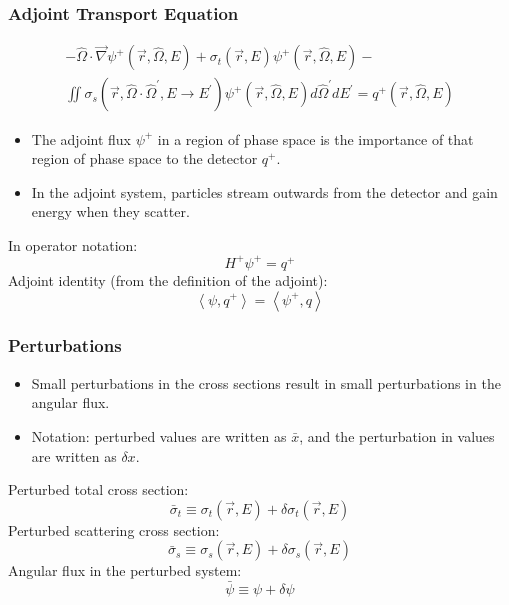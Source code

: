 \documentclass[t]{beamer}
\begin{document}
\begin{frame}
  \frametitle{Adjoint Transport Equation}
  \begin{multline}
    -\hat{\Omega}\cdot\vec{\nabla}\psi^+\left(\vec{r},\hat{\Omega},E\right) +
    \sigma_t\left(\vec{r},E\right)\psi^+\left(\vec{r},\hat{\Omega},E\right) - \\
    \iint\sigma_s\left(\vec{r},\hat{\Omega}\cdot\hat{\Omega}^\prime,E\rightarrow E^\prime\right)\psi^+\left(\vec{r},\hat{\Omega},E\right)d\hat{\Omega}^\prime dE^\prime =
    q^+\left(\vec{r},\hat{\Omega},E\right)
  \end{multline}
  \begin{itemize}
    \item The adjoint flux $\psi^+$ in a region of phase space is the importance
          of that region of phase space to the detector $q^+$.
    \item In the adjoint system, particles stream outwards from the detector and
          gain energy when they scatter.
  \end{itemize}
  In operator notation:
  \begin{equation}
    H^+\psi^+ = q^+
  \end{equation}
  Adjoint identity (from the definition of the adjoint):
  \begin{equation}
    \left<\psi,q^+\right> = \left<\psi^+,q\right>
  \end{equation}
\end{frame}

\begin{frame}
  \frametitle{Perturbations}
  \begin{itemize}
    \item Small perturbations in the cross sections result in small
          perturbations in the angular flux.
    \item Notation: perturbed values are written as $\bar{x}$, and
          the perturbation in values are written as $\delta x$.
  \end{itemize}
  Perturbed total cross section:
  \begin{equation}
    \bar{\sigma}_t \equiv \sigma_t\left(\vec{r},E\right) + \delta\sigma_t\left(\vec{r},E\right)
  \end{equation}
  Perturbed scattering cross section:
  \begin{equation}
    \bar{\sigma}_s \equiv \sigma_s\left(\vec{r},E\right) + \delta\sigma_s\left(\vec{r},E\right)
  \end{equation}
  Angular flux in the perturbed system:
  \begin{equation}
    \bar{\psi} \equiv \psi + \delta\psi
  \end{equation}
\end{frame}
\end{document}
